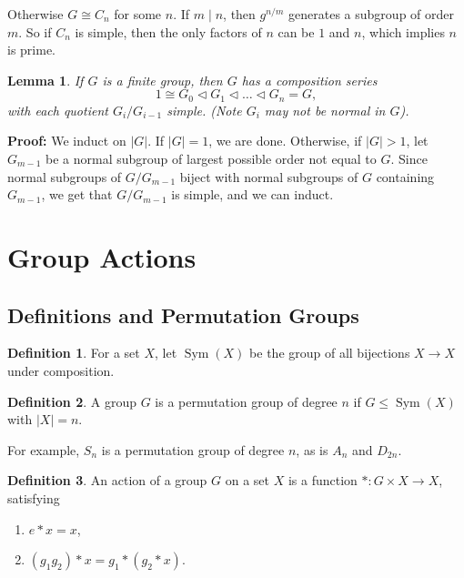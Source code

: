 \documentclass[12pt]{article}
\DeclareMathOperator{\Sym}{Sym}
\newtheorem{lemma}{Lemma}[section]
\theoremstyle{definition}
\newtheorem{definition}{Definition}[section]
\theoremstyle{remark}
\begin{document}
Otherwise $G \cong C_n$ for some $n$. If $m \mid n$, then $g^{n/m}$ generates a subgroup of order $m$. So if $C_n$ is simple, then the only factors of $n$ can be $1$ and $n$, which implies $n$ is prime.

\newpage

\begin{lemma}
	If $G$ is a finite group, then $G$ has a composition series
	\[
	1 \cong G_0 \lhd G_1 \lhd \ldots \lhd G_n = G
	,\]
	with each quotient $G_i / G_{i-1}$ simple. (Note $G_i$ may not be normal in $G$).
\end{lemma}

\begin{adjustbox}{minipage = \columnwidth - 25.5pt, margin=1em, frame=1pt, margin=0em}
\textbf{Proof:} We induct on $|G|$. If $|G| = 1$, we are done. Otherwise, if $|G| > 1$, let $G_{m-1}$ be a normal subgroup of largest possible order not equal to $G$. Since normal subgroups of $G/G_{m-1}$ biject with normal subgroups of $G$ containing $G_{m-1}$, we get that $G/G_{m-1}$ is simple, and we can induct.

\end{adjustbox}

\newpage

\section{Group Actions}%
\label{sec:group_actions}

\subsection{Definitions and Permutation Groups}%
\label{sub:definitions_and_permutation_groups}

\begin{definition}
	For a set $X$, let $\Sym(X)$ be the group of all bijections $X \to X$ under composition.
\end{definition}

\begin{definition}
	A group $G$ is a permutation group of degree $n$ if $G \leq \Sym(X)$ with $|X| = n$.
\end{definition}

For example, $S_n$ is a permutation group of degree $n$, as is $A_n$ and $D_{2n}$.

\begin{definition}
	An action of a group $G$ on a set $X$ is a function $\ast : G \times X \to X$, satisfying
	\begin{enumerate}[label = (\roman*)]
		\item $e \ast x = x$,
		\item $(g_1g_2) \ast x = g_1 \ast (g_2 \ast x)$.
	\end{enumerate}
\end{definition}
\end{document}
